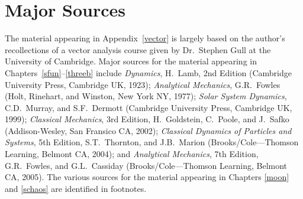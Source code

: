 \section{Major Sources}
The material appearing in Appendix~\ref{vector} is largely based on the author's recollections
of a vector analysis course given by Dr.~Stephen Gull at the University
of Cambridge. Major sources for the material appearing in Chapters~\ref{sfun}--\ref{threeb}
include  
{\em Dynamics}, H.~Lamb, 2nd Edition (Cambridge University Press, Cambridge UK, 1923);
{\em Analytical Mechanics}, G.R.~Fowles (Holt, Rinehart, and Winston,
New York NY, 1977); 
{\em Solar System Dynamics}, C.D.~Murray, and S.F.~Dermott (Cambridge University Press,
Cambridge UK, 1999);
{\em Classical Mechanics}, 3rd Edition, H.~Goldstein, C.~Poole, and J.~Safko (Addison-Wesley,
San Fransico CA, 2002);
{\em Classical Dynamics of Particles and Systems}, 5th Edition, S.T.~Thornton, and
 J.B.~Marion (Brooks/Cole---Thomson Learning, Belmont CA, 2004); and
{\em Analytical Mechanics}, 7th Edition,  G.R.~Fowles, and G.L.~Cassiday
(Brooks/Cole---Thomson Learning, Belmont CA, 2005). The various sources for
the material appearing in Chapters \ref{moon} and \ref{schaos} are identified in footnotes.

